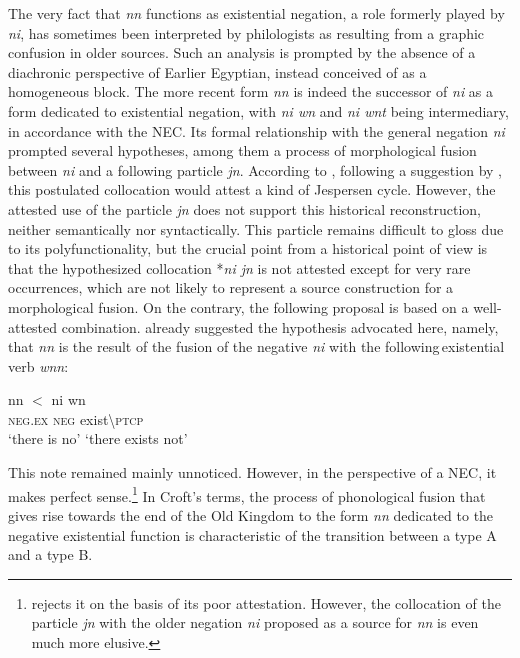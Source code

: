 \documentclass[output=paper,draft,draftmode,colorlinks,citecolor=brown]{langscibook}
\begin{document}
The very fact that \textit{nn} functions as existential negation, a role formerly played by \textit{ni}, has sometimes been interpreted by philologists as resulting from a graphic confusion in older sources. Such an analysis is prompted by the absence of a diachronic perspective of Earlier Egyptian, instead conceived of as a homogeneous block. The more recent form \textit{nn} is indeed the successor of \textit{ni} as a form dedicated to existential negation, with \textit{ni wn} and \textit{ni wnt} being intermediary, in accordance with the NEC. Its formal relationship with the general negation \textit{ni} prompted several hypotheses, among them a process of morphological fusion between \textit{ni} and a following particle \textit{jn}. According to \citet[127]{Loprieno1995}, following a suggestion by \citet{Osing1979}, this postulated collocation would attest a kind of Jespersen cycle. However, the attested use of the particle \textit{jn} does not support this historical reconstruction, neither semantically nor syntactically. This particle remains difficult to gloss due to its polyfunctionality, but the crucial point from a historical point of view is that the hypothesized collocation *\textit{ni jn} is not attested except for very rare occurrences, which are not likely to represent a source construction for a morphological fusion. On the contrary, the following proposal is based on a well-attested combination. \citet[359]{Vergote1965formes} already suggested the hypothesis advocated here, namely, that \textit{nn} is the result of the fusion of the negative \textit{ni} with the following existential verb \textit{wnn}:  

\ea \label{ex:AE29}
    \gll nn $<$ ni wn\\ 
    \textsc{neg.ex} {} \textsc{neg} exist\textbackslash\textsc{ptcp} \\
    \glt ‘there is no’ ‘there exists not’ 
\z

This note remained mainly unnoticed. However, in the perspective of a NEC, it makes perfect sense.\footnote{\citet[311]{Osing1979} rejects it on the basis of its poor attestation. However, the collocation of the particle \textit{jn} with the older negation \textit{ni} proposed as a source for \textit{nn} is even much more elusive.} In Croft’s \citeyearpar{Croft1991} terms, the process of phonological fusion that gives rise towards the end of the Old Kingdom to the form \textit{nn} dedicated to the negative existential function is characteristic of the transition between a type A and a type B.  
 
\end{document}
